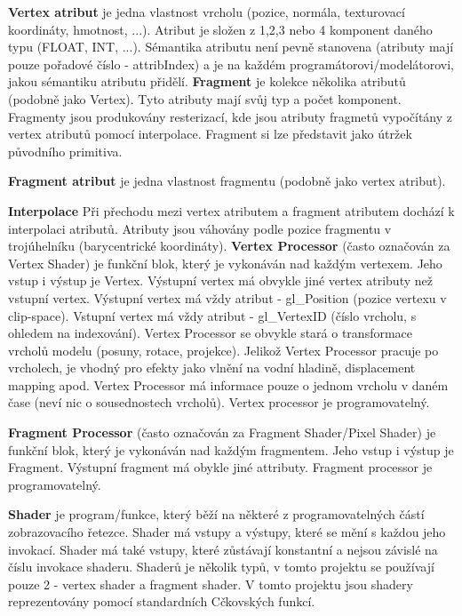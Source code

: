 {\bfseries Vertex atribut} je jedna vlastnost vrcholu (pozice, normála, texturovací koordináty, hmotnost, ...). Atribut je složen z 1,2,3 nebo 4 komponent daného typu (F\+L\+O\+AT, I\+NT, ...). Sémantika atributu není pevně stanovena (atributy mají pouze pořadové číslo -\/ attrib\+Index) a je na každém programátorovi/modelátorovi, jakou sémantiku atributu přidělí.  {\bfseries Fragment} je kolekce několika atributů (podobně jako Vertex). Tyto atributy mají svůj typ a počet komponent. Fragmenty jsou produkovány resterizací, kde jsou atributy fragmetů vypočítány z vertex atributů pomocí interpolace. Fragment si lze představit jako útržek původního primitiva.

{\bfseries Fragment atribut} je jedna vlastnost fragmentu (podobně jako vertex atribut).

{\bfseries Interpolace} Při přechodu mezi vertex atributem a fragment atributem dochází k interpolaci atributů. Atributy jsou váhovány podle pozice fragmentu v trojúhelníku (barycentrické koordináty).  {\bfseries Vertex Processor} (často označován za Vertex Shader) je funkční blok, který je vykonáván nad každým vertexem. Jeho vstup i výstup je Vertex. Výstupní vertex má obvykle jiné vertex atributy než vstupní vertex. Výstupní vertex má vždy atribut -\/ gl\+\_\+\+Position (pozice vertexu v clip-\/space). Vstupní vertex má vždy atribut -\/ gl\+\_\+\+Vertex\+ID (číslo vrcholu, s ohledem na indexování). Vertex Processor se obvykle stará o transformace vrcholů modelu (posuny, rotace, projekce). Jelikož Vertex Processor pracuje po vrcholech, je vhodný pro efekty jako vlnění na vodní hladině, displacement mapping apod. Vertex Processor má informace pouze o jednom vrcholu v daném čase (neví nic o sousednostech vrcholů). Vertex processor je programovatelný.

{\bfseries Fragment Processor} (často označován za Fragment Shader/\+Pixel Shader) je funkční blok, který je vykonáván nad každým fragmentem. Jeho vstup i výstup je Fragment. Výstupní fragment má obykle jiné attributy. Fragment processor je programovatelný.

{\bfseries Shader} je program/funkce, který běží na některé z programovatelných částí zobrazovacího řetezce. Shader má vstupy a výstupy, které se mění s každou jeho invokací. Shader má také vstupy, které zůstávají konstantní a nejsou závislé na číslu invokace shaderu. Shaderů je několik typů, v tomto projektu se používají pouze 2 -\/ vertex shader a fragment shader. V tomto projektu jsou shadery reprezentovány pomocí standardních Cčkovských funkcí.

